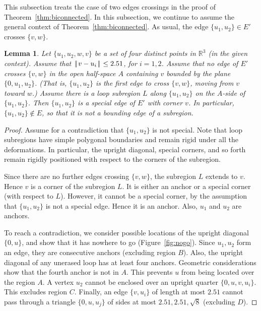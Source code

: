 \documentclass[11pt]{amsart}
\newcommand{\ring}[1]{\mathbb{#1}}
\def\|{{\hskip0.1em|\hskip-0.15em|\hskip0.1em}}
\newtheorem{lemma}{Lemma}
\begin{document}
This subsection treats the case of two edges crossings in the proof
of Theorem~\ref{thm:biconnected}.
In this subsection, we continue to assume the general context of Theorem~\ref{thm:biconnected}.  As usual, 
the edge $\{u_1,u_2\}\in E'$ crosses $\{v,w\}$.

\begin{lemma}\label{lemma:special}
Let $\{u_1,u_2,w,v\}$ be a set of four distinct points
in $\ring{R}^3$ (in the given context).  
Assume that
 $\|v-u_i\|\le 2.51$, for $i=1,2$.
Assume that no edge of $E'$ crosses $\{v,w\}$
in the open 
half-space $A$ containing $v$ bounded by the plane $\{0,u_1,u_2\}$.
(That is, $\{u_1,u_2\}$ is the first edge to cross $\{v,w\}$, moving
from $v$ toward $w$.)
Assume there is a loop subregion $L$ along 
$\{u_1,u_2\}$ on the $A$-side
of $\{u_1,u_2\}$.  Then $\{u_1,u_2\}$ is a special edge of $E'$ with
corner $v$.
In particular, $\{u_1,u_2\}\not\in E$, so that it is not a bounding
edge of a subregion.
\end{lemma}

\begin{proof}
Assume for a contradiction that $\{u_1,u_2\}$ is not special.
Note that loop subregions have simple polygonal boundaries and
remain rigid under all the deformations.  In particular,
the upright diagonal, special corners, and so forth
remain rigidly positioned with respect to the corners of the subregion.

Since there are no further edges crossing $\{v,w\}$, the subregion
$L$ extends to $v$.  Hence $v$ is a corner of the subregion $L$.
It is either an anchor or a special corner (with respect to $L$). However, it cannot be a special
corner, by the assumption that $\{u_1,u_2\}$ is not a special edge.
Hence it is an anchor.  Also, $u_1$ and $u_2$ are anchors.

To reach a contradiction, 
we consider possible locations of the upright diagonal $\{0,u\}$,
and show that it has nowhere to go (Figure~\ref{fig:nogo}).  
Since $u_1,u_2$ form an edge,
they are consecutive anchors (excluding region $B$).  
Also, the upright diagonal of any
unerased loop has at least four anchors.  Geometric considerations show that
the fourth anchor is not in $A$.  This prevents $u$ from
being located over the region $A$.
A vertex $u_2$ cannot be enclosed over an upright quarter $\{0,u,v,u_i\}$.  This excludes
 region $C$.  Finally, an edge $\{v,u_i\}$
of length at most $2.51$ cannot pass through a triangle $\{0,u,u_j\}$
of sides at most $2.51,2.51,\sqrt8$ (excluding $D$).
\end{proof}
\end{document}
